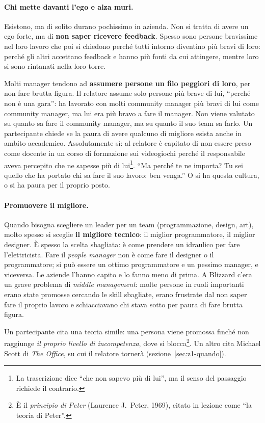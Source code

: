 \paragraph{Chi mette davanti l'ego e alza muri.} Esistono, ma di solito durano
pochissimo in azienda. Non si tratta di avere un ego forte, ma di \textbf{non
saper ricevere feedback}. Spesso sono persone bravissime nel loro lavoro che
poi si chiedono perché tutti intorno diventino più bravi di loro: perché gli
altri accettano feedback e hanno più fonti da cui attingere, mentre loro si
sono rintanati nella loro torre.

Molti manager tendono ad \textbf{assumere persone un filo peggiori di loro},
per non fare brutta figura. Il relatore assume solo persone più brave di lui,
``perché non è una gara'': ha lavorato con molti community manager più bravi
di lui come community manager, ma lui era più bravo a fare il manager. Non
viene valutato su quanto sa fare il community manager, ma su quanto il suo
team sa farlo. Un partecipante chiede se la paura di avere qualcuno di
migliore esista anche in ambito accademico. Assolutamente sì: al relatore è
capitato di non essere preso come docente in un corso di formazione sui
videogiochi perché il responsabile aveva percepito che ne sapesse più di
lui\footnote{La trascrizione dice ``che non sapevo più di lui'', ma il senso
del passaggio richiede il contrario.}. ``Ma perché te ne importa? Tu sei quello che ha portato chi
sa fare il suo lavoro: ben venga.'' O si ha questa cultura, o si ha paura per
il proprio posto.

\paragraph{Promuovere il migliore.} Quando bisogna scegliere un leader per un
team (programmazione, design, art), molto spesso si sceglie \textbf{il migliore
tecnico}: il miglior programmatore, il miglior designer. È spesso la scelta
sbagliata: è come prendere un idraulico per fare l'elettricista. Fare il
\emph{people manager} non è come fare il designer o il programmatore; si può
essere un ottimo programmatore e un pessimo manager, e viceversa. Le aziende
l'hanno capito e lo fanno meno di prima. A Blizzard c'era un grave problema di
\emph{middle management}: molte persone in ruoli importanti erano state
promosse cercando le skill sbagliate, erano frustrate dal non saper fare il
proprio lavoro e schiacciavano chi stava sotto per paura di fare brutta
figura.

Un partecipante cita una teoria simile: una persona viene promossa finché non
raggiunge \emph{il proprio livello di incompetenza}, dove si blocca\footnote{È
il \emph{principio di Peter} (Laurence J.\ Peter, 1969), citato in lezione
come ``la teoria di Peter''.}. Un altro cita Michael Scott di \emph{The
Office}, su cui il relatore tornerà (sezione~\ref{sec:z1-quando}).

